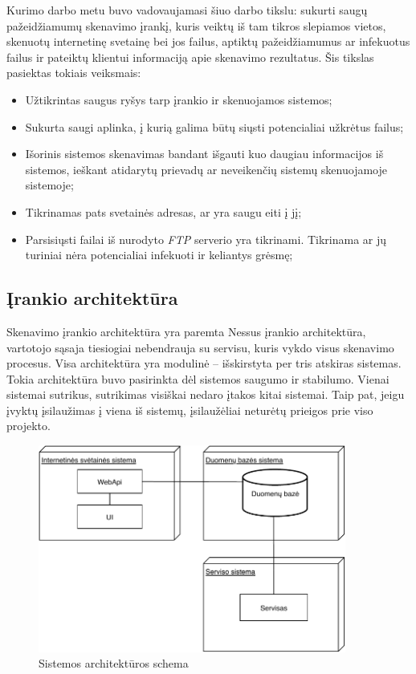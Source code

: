 \documentclass[a4paper,12pt,fleqn]{article}
\begin{document}

Kurimo darbo metu buvo vadovaujamasi šiuo darbo tikslu: sukurti saugų pažeidžiamumų skenavimo įrankį, kuris veiktų iš tam tikros slepiamos vietos, skenuotų internetinę
svetainę bei jos failus, aptiktų pažeidžiamumus ar infekuotus failus ir pateiktų klientui informaciją apie skenavimo rezultatus. Šis tikslas pasiektas tokiais veiksmais:
\begin{itemize}
	\item Užtikrintas saugus ryšys tarp įrankio ir skenuojamos sistemos;
	\item Sukurta saugi aplinka, į kurią galima būtų siųsti potencialiai užkrėtus failus;
	\item Išorinis sistemos skenavimas bandant išgauti kuo daugiau informacijos iš sistemos, ieškant atidarytų prievadų ar neveikenčių sistemų skenuojamoje sistemoje;
	\item Tikrinamas pats svetainės adresas, ar yra saugu eiti į jį;
	\item Parsisiųsti failai iš nurodyto \textit{FTP} serverio yra tikrinami. Tikrinama ar jų turiniai nėra potencialiai infekuoti ir keliantys grėsmę;
\end{itemize}



\subsection{Įrankio architektūra}

Skenavimo įrankio architektūra yra paremta Nessus įrankio architektūra, vartotojo sąsaja tiesiogiai nebendrauja su servisu, kuris vykdo visus skenavimo procesus. Visa architektūra yra modulinė – išskirstyta per tris atskiras sistemas. Tokia architektūra buvo pasirinkta dėl sistemos saugumo ir stabilumo. Vienai sistemai sutrikus, sutrikimas visiškai nedaro įtakos kitai sistemai. Taip pat, jeigu įvyktų įsilaužimas į viena iš sistemų, įsilaužėliai neturėtų prieigos prie viso projekto.

\begin{figure}[H]
	\centering
	\includegraphics[width=0.9\textwidth]{figs/arch1lt.pdf}
	\caption{Sistemos architektūros schema}
	\label{fig:arch1}
\end{figure}
\end{document}
